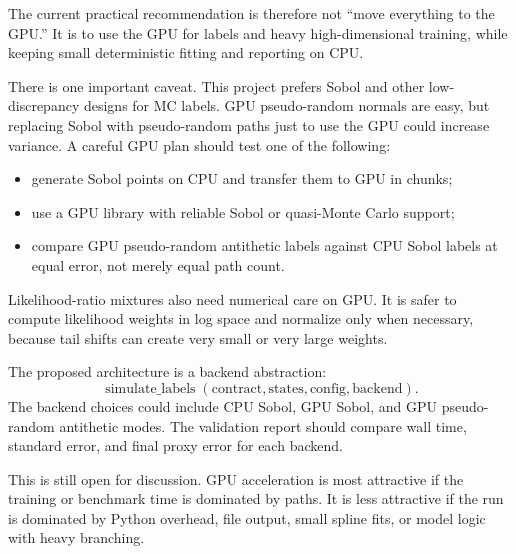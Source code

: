 \documentclass[11pt,oneside]{book}
\theoremstyle{definition}
\begin{document}
The current practical recommendation is therefore not ``move everything to the
GPU.'' It is to use the GPU for labels and heavy high-dimensional training,
while keeping small deterministic fitting and reporting on CPU.

There is one important caveat. This project prefers Sobol and other
low-discrepancy designs for MC labels. GPU pseudo-random normals are easy, but
replacing Sobol with pseudo-random paths just to use the GPU could increase
variance. A careful GPU plan should test one of the following:
\begin{itemize}
  \item generate Sobol points on CPU and transfer them to GPU in chunks;
  \item use a GPU library with reliable Sobol or quasi-Monte Carlo support;
  \item compare GPU pseudo-random antithetic labels against CPU Sobol labels at
        equal error, not merely equal path count.
\end{itemize}

Likelihood-ratio mixtures also need numerical care on GPU. It is safer to
compute likelihood weights in log space and normalize only when necessary,
because tail shifts can create very small or very large weights.

The proposed architecture is a backend abstraction:
\[
  \operatorname{simulate\_labels}(\text{contract},\text{states},\text{config},\text{backend}).
\]
The backend choices could include CPU Sobol, GPU Sobol, and GPU
pseudo-random antithetic modes. The validation report should compare
wall time, standard error, and final proxy error for each backend.

This is still open for discussion. GPU acceleration is most attractive if the
training or benchmark time is dominated by paths. It is less attractive if the
run is dominated by Python overhead, file output, small spline fits, or model
logic with heavy branching.
\end{document}
